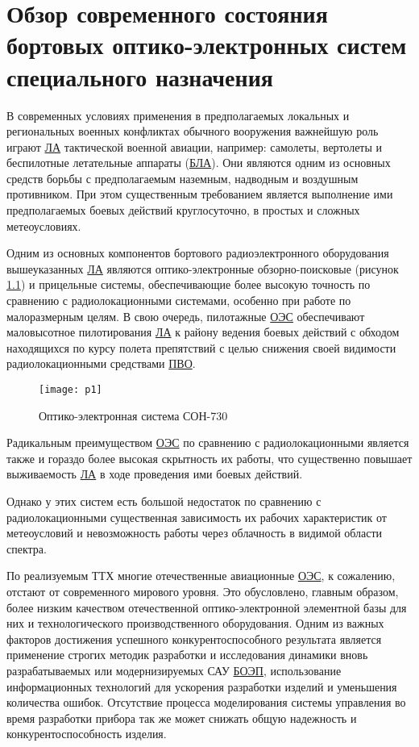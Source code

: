 \chapter{Обзор современного состояния бортовых оптико-электронных систем специального назначения} \label{ch:ch1}

В современных условиях применения в предполагаемых локальных и региональных военных конфликтах обычного вооружения важнейшую роль играют  \hyperref[acroLA]{ЛА} тактической военной авиации, например: самолеты, вертолеты и беспилотные летательные аппараты (\hyperref[acroUAV]{БЛА}). Они являются одним из основных средств борьбы с предполагаемым наземным, надводным и воздушным противником. При этом существенным требованием является выполнение ими предполагаемых боевых действий круглосуточно, в простых и сложных метеоусловиях. 

Одним из основных компонентов бортового радиоэлектронного оборудования вышеуказанных  \hyperref[acroLA]{ЛА} являются оптико-электронные обзорно-поисковые 
(рисунок \ref{fig:soep}) и прицельные системы, обеспечивающие более высокую точность по сравнению с радиолокационными системами, особенно при работе по малоразмерным целям. В свою очередь, пилотажные \hyperref[acroEOS]{ОЭС} обеспечивают маловысотное пилотирования \hyperref[acroLA]{ЛА} к району ведения боевых действий с обходом находящихся по курсу полета препятствий с целью снижения своей видимости радиолокационными средствами  \hyperref[acroPVO]{ПВО}.

\begin{figure}[ht]
	\centering
 \texttt{[image: p1]} 
 \caption{Оптико-электронная система СОН-730}
 \label{fig:soep}
\end{figure}

Радикальным преимуществом \hyperref[acroEOS]{ОЭС} по сравнению с радиолокационными является также и гораздо более высокая скрытность их работы, что существенно повышает выживаемость  \hyperref[acroLA]{ЛА} в ходе проведения ими боевых действий. 

Однако у этих систем есть большой недостаток по сравнению с радиолокационными существенная зависимость их рабочих характеристик от метеоусловий и невозможность работы через облачность в видимой области спектра. 

По реализуемым ТТХ многие отечественные авиационные  \hyperref[acroEOS]{ОЭС}, к сожалению, отстают от современного мирового уровня. Это обусловлено, главным образом, более низким качеством отечественной оптико-электронной элементной базы для них и технологического производственного оборудования. Одним из важных факторов достижения успешного конкурентоспособного результата является применение строгих методик разработки и исследования динамики вновь разрабатываемых или модернизируемых САУ \hyperref[acroAEOS]{БОЭП}, использование информационных технологий для ускорения разработки изделий и уменьшения количества ошибок. Отсутствие процесса моделирования системы управления во время разработки прибора так же может снижать общую надежность и конкурентоспособность изделия.

